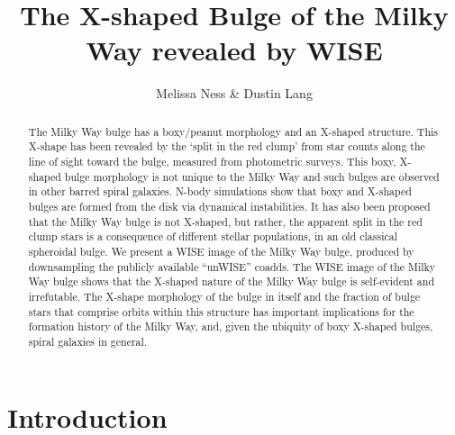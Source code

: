 \documentclass[12pt, preprint]{aastex}
\begin{document}
\title{The X-shaped Bulge of the Milky Way revealed by WISE}
\author{%
Melissa Ness \& %
Dustin Lang
}
%
\begin{abstract}%
The Milky Way bulge has a boxy/peanut morphology and an X-shaped structure. This X-shape has been revealed by the `split in the red clump' from 
star counts along the line of sight toward the bulge, measured from photometric surveys. This boxy, X-shaped bulge morphology is not unique to the Milky Way and such bulges are observed in other barred spiral galaxies.  N-body simulations show that boxy and X-shaped bulges are formed from the disk via dynamical instabilities.  It has also been proposed that the Milky Way bulge is not X-shaped, but rather, the apparent split in the red clump stars is a consequence of different stellar populations, in an old classical spheroidal bulge. We present a WISE image of the Milky Way bulge, produced by downsampling the publicly available ``unWISE'' coadds. The WISE image of the Milky Way bulge shows that the X-shaped nature of the Milky Way bulge is self-evident and irrefutable. The X-shape morphology of the bulge in itself and the fraction of bulge stars that comprise orbits within this structure has important implications for the formation history of the Milky Way, and, given the ubiquity of boxy X-shaped bulges, spiral galaxies in general. 
\end{abstract}




\section{Introduction}\label{sec:Intro}
\end{document}
